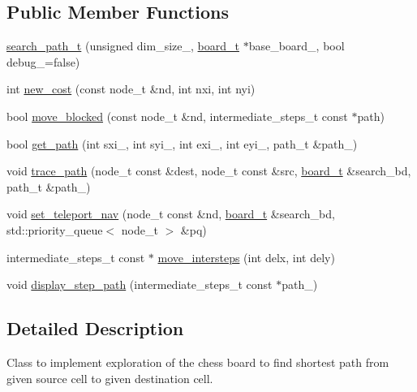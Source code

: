 \subsection*{\-Public \-Member \-Functions}
\begin{DoxyCompactItemize}
\item 
\hyperlink{classknight__t_1_1search__path__t_a56a14b89bbb9a6c3cfe8828789019fd3}{search\-\_\-path\-\_\-t} (unsigned dim\-\_\-size\-\_\-, \hyperlink{classknight__t_1_1board__t}{board\-\_\-t} $\ast$base\-\_\-board\-\_\-, bool debug\-\_\-=false)
\item 
int \hyperlink{classknight__t_1_1search__path__t_a7456c6c3d1a28e340e7b575f7575df7f}{new\-\_\-cost} (const node\-\_\-t \&nd, int nxi, int nyi)
\item 
bool \hyperlink{classknight__t_1_1search__path__t_afe31cd48e27641661603db2f706a7e2b}{move\-\_\-blocked} (const node\-\_\-t \&nd, intermediate\-\_\-steps\-\_\-t const $\ast$path)
\item 
bool \hyperlink{classknight__t_1_1search__path__t_afac040432438dccdeaf6ced5672b5d3b}{get\-\_\-path} (int sxi\-\_\-, int syi\-\_\-, int exi\-\_\-, int eyi\-\_\-, path\-\_\-t \&path\-\_\-)
\item 
void \hyperlink{classknight__t_1_1search__path__t_a7816702b3940673703c17f9cd7785786}{trace\-\_\-path} (node\-\_\-t const \&dest, node\-\_\-t const \&src, \hyperlink{classknight__t_1_1board__t}{board\-\_\-t} \&search\-\_\-bd, path\-\_\-t \&path\-\_\-)
\item 
void \hyperlink{classknight__t_1_1search__path__t_a7682109127e23f472c01fdf50bdded1b}{set\-\_\-teleport\-\_\-nav} (node\-\_\-t const \&nd, \hyperlink{classknight__t_1_1board__t}{board\-\_\-t} \&search\-\_\-bd, std\-::priority\-\_\-queue$<$ node\-\_\-t $>$ \&pq)
\item 
intermediate\-\_\-steps\-\_\-t const $\ast$ \hyperlink{classknight__t_1_1search__path__t_a412dd6f1b26de6313bd4b56470972bc9}{move\-\_\-intersteps} (int delx, int dely)
\item 
void \hyperlink{classknight__t_1_1search__path__t_aa998648c3a7765b79ad6bc26f37459dd}{display\-\_\-step\-\_\-path} (intermediate\-\_\-steps\-\_\-t const $\ast$path\-\_\-)
\end{DoxyCompactItemize}


\subsection{\-Detailed \-Description}
\-Class to implement exploration of the chess board to find shortest path from given source cell to given destination cell. 

